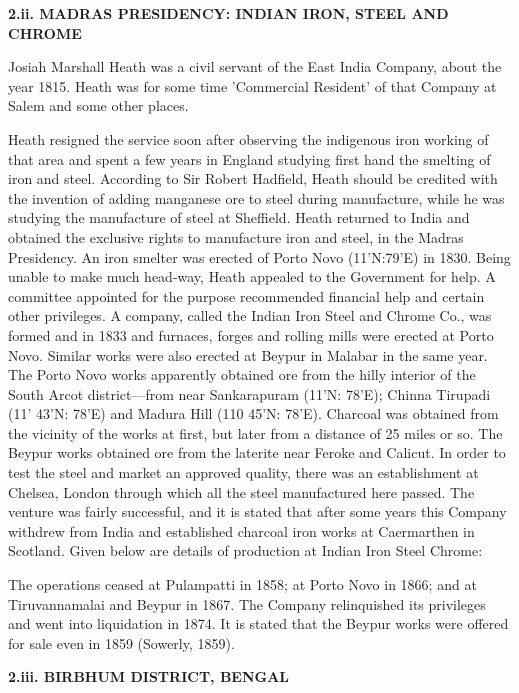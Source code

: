 \textbf{2.ii. MADRAS PRESIDENCY: INDIAN IRON, STEEL AND CHROME}

Josiah Marshall Heath was a civil servant of the East India Company, about the year 1815. Heath was for some time 'Commercial Resident' of that Company at Salem and some other places.

Heath resigned the service soon after observing the indigenous iron working of that area and spent a few years in England studying first hand the smelting of iron and steel. According to Sir Robert Hadfield, Heath should be credited with the invention of adding manganese ore to steel during manufacture, while he was studying the manufacture of steel at Sheffield. Heath returned to India and obtained the exclusive rights to manufacture iron and steel, in the Madras Presidency. An iron smelter was erected of Porto Novo (11’N:79’E) in 1830. Being unable to make much head-way, Heath appealed to the Government for help. A committee appointed for the purpose recommended financial help and certain other privileges. A company, called the Indian Iron Steel and Chrome Co., was formed and in 1833 and furnaces, forges and rolling mills were erected at Porto Novo. Similar works were also erected at Beypur in Malabar in the same year. The Porto Novo works apparently obtained ore from the hilly interior of the South Arcot district—from near Sankarapuram (11’N: 78’E); Chinna Tirupadi (11’ 43’N: 78’E) and Madura Hill (110 45’N: 78’E). Charcoal was obtained from the vicinity of the works at first, but later from a distance of 25 miles or so. The Beypur works obtained ore from the laterite near Feroke and Calicut. In order to test the steel and market an approved quality, there was an establishment at Chelsea, London through which all the steel manufactured here passed. The venture was fairly successful, and it is stated that after some years this Company withdrew from India and established charcoal iron works at Caermarthen in Scotland. Given below are details of production at Indian Iron Steel Chrome:

The operations ceased at Pulampatti in 1858; at Porto Novo in 1866; and at Tiruvannamalai and Beypur in 1867. The Company relinquished its privileges and went into liquidation in 1874. It is stated that the Beypur works were offered for sale even in 1859 (Sowerly, 1859).

\textbf{2.iii. BIRBHUM DISTRICT, BENGAL}


